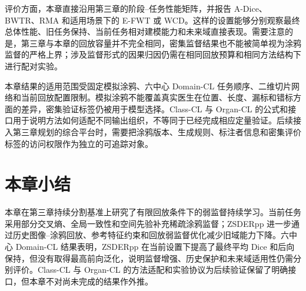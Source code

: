 评价方面，本章直接沿用第三章的阶段--任务性能矩阵，并报告 A-Dice、BWTR、RMA 和适用场景下的 E-FWT 或 WCD。这样的设置能够分别观察最终总体性能、旧任务保持、当前任务相对建模能力和未来域直接表现。需要注意的是，第三章与本章的回放容量并不完全相同，密集监督结果也不能被简单视为涂鸦监督的严格上界；涉及监督形式的因果归因仍需在相同回放预算和相同方法结构下进行配对实验。

本章结果的适用范围受固定模拟涂鸦、六中心 Domain-CL 任务顺序、二维切片网络和当前回放配置限制。模拟涂鸦不能覆盖真实医生在位置、长度、漏标和错标方面的差异，密集验证标签仍被用于模型选择。Class-CL 与 Organ-CL 的公式和接口用于说明方法如何适配不同输出组织，不等同于已经完成相应定量验证。后续接入第三章规划的综合平台时，需要把涂鸦版本、生成规则、标注者信息和密集评价标签的访问权限作为独立的可追踪对象。

\section{本章小结}
\label{sec:scribblecl-summary}

本章在第三章持续分割基准上研究了有限回放条件下的弱监督持续学习。当前任务采用部分交叉熵、全局一致性和空间先验补充稀疏涂鸦监督；ZSDERpp 进一步通过历史图像--涂鸦回放、参考特征约束和回放弱监督优化减少旧域能力下降。六中心 Domain-CL 结果表明，ZSDERpp 在当前设置下提高了最终平均 Dice 和后向保持，但没有取得最高前向泛化，说明监督增强、历史保护和未来域适用性仍需分别评价。Class-CL 与 Organ-CL 的方法适配和实验协议为后续验证保留了明确接口，但本章不对尚未完成的结果作外推。
